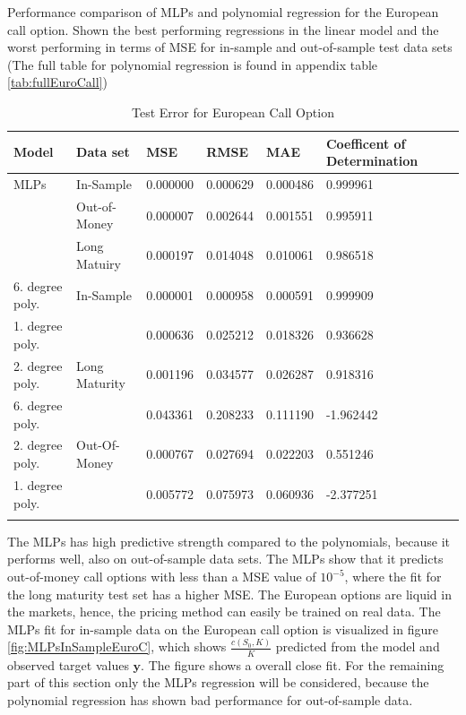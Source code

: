 \begin{table}[H]
\caption{Test Error for European Call Option}{Performance comparison of MLPs and polynomial regression for the European call option. Shown the best performing regressions in the linear model and the worst performing in terms of MSE for in-sample and out-of-sample test data sets (The full table for polynomial regression is found in appendix table \ref{tab:fullEuroCall})}
\label{tab:ComparePolyWithMLPS}
\centering
\begin{tabular}{l l l l l l l }
\toprule
\textbf{Model} & \textbf{Data set} & \textbf{MSE} & \textbf{RMSE} & \textbf{MAE} & \textbf{Coefficent of Determination} \\
\midrule
MLPs & In-Sample & 0.000000 & 0.000629 & 0.000486 & 0.999961\\
& Out-of-Money & 0.000007 & 0.002644 & 0.001551 & 0.995911\\
& Long Matuiry & 0.000197 & 0.014048 & 0.010061 & 0.986518\\
6. degree poly. & In-Sample & 0.000001 & 0.000958 & 0.000591 & 0.999909\\
1. degree poly. &  & 0.000636 & 0.025212 & 0.018326 & 0.936628\\
2. degree poly. & Long Maturity & 0.001196 & 0.034577 & 0.026287 & 0.918316\\
6. degree poly. &  & 0.043361 & 0.208233 & 0.111190 & -1.962442\\
2. degree poly. & Out-Of-Money & 0.000767 & 0.027694 & 0.022203 & 0.551246\\
1. degree poly. &  & 0.005772 & 0.075973 & 0.060936 & -2.377251\\
\bottomrule\\
\end{tabular}
\end{table}

The MLPs has high predictive strength compared to the polynomials, because it performs well, also on out-of-sample data sets. The MLPs show that it predicts out-of-money call options with less than a MSE value of $10^{-5}$, where the fit for the long maturity test set has a higher MSE. The European options are liquid in the markets, hence, the pricing method can easily be trained on real data. The MLPs fit for in-sample data on the European call option is visualized in figure \ref{fig:MLPsInSampleEuroC}, which shows $\frac{c(S_0,K)}{K}$ predicted from the model and observed target values $\bm{y}$. The figure shows a overall close fit. For the remaining part of this section only the MLPs regression will be considered, because the polynomial regression has shown bad performance for out-of-sample data.

